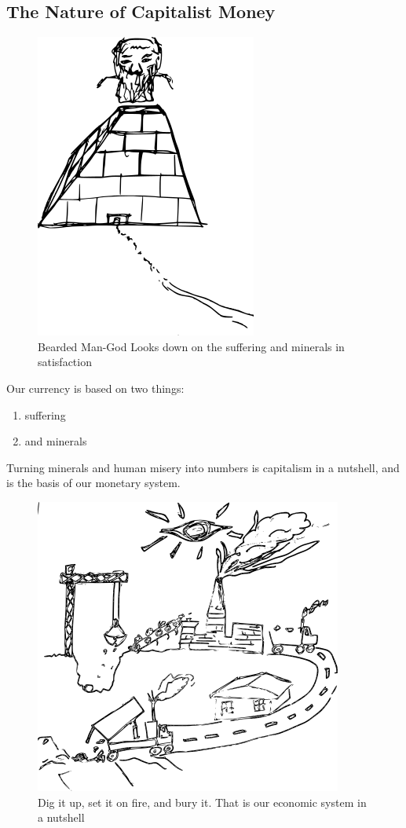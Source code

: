 \subsection{The Nature of Capitalist
Money}\label{the-nature-of-capitalist-money}

\begin{figure}[htbp]
\centering
\includegraphics{images/capitalpyramid.png}
\caption{Bearded Man-God Looks down on the suffering and minerals in
satisfaction}
\end{figure}

Our currency is based on two things:

\begin{enumerate}
\def\labelenumi{\arabic{enumi}.}
\item
  suffering
\item
  and minerals
\end{enumerate}

Turning minerals and human misery into numbers is capitalism in a
nutshell, and is the basis of our monetary system.

\begin{figure}[htbp]
\centering
\includegraphics{images/digitup.png}
\caption{Dig it up, set it on fire, and bury it. That is our economic
system in a nutshell}
\end{figure}

